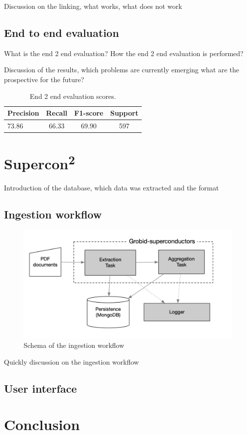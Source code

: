 \documentclass{article}
\begin{document}
Discussion on the linking, what works, what does not work 

\subsection{End to end evaluation}

What is the end 2 end evaluation? 
How the end 2 end evaluation is performed? 

Discussion of the results, which problems are currently emerging what are the prospective for the future?

\begin{table}[ht]
\centering
\begin{tabular}{lccc}
\hline \textbf{Precision} & \textbf{Recall} & \textbf{F1-score} & \textbf{Support} \\ \hline
73.86  &	66.33 &	69.90 & 597\\
\hline
\end{tabular}
\caption{End 2 end evaluation scores. }
\end{table}

\section{Supercon\textsuperscript{2}}

Introduction of the database, which data was extracted and the format 

\subsection{Ingestion workflow}

\begin{figure}[ht]
\includegraphics[width=\textwidth]{workflow-schema-1}
\caption{Schema of the ingestion workflow}
\end{figure}


Quickly discussion on the ingestion workflow 


\subsection{User interface}


\section{Conclusion}



\end{document}
